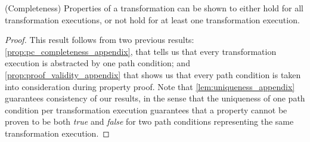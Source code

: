 \begin{pf}

\end{pf}


\begin{proposition}{(Completeness) Properties of a transformation can be shown to either hold for all transformation executions, or not hold for at least one transformation execution.}
\label{prop:proof_completeness_appendix}
\end{proposition}
\begin{proof}
This result follows from two previous results: \cref{prop:pc_completeness_appendix}, that tells us that every transformation execution is abstracted by one path condition; and \cref{prop:proof_validity_appendix} that shows us that every path condition is taken into consideration during property proof. Note that \cref{lem:uniqueness_appendix} guarantees consistency of our results, in the sense that the uniqueness of one path condition per transformation execution guarantees that a property cannot be proven to be both \emph{true} and \emph{false} for two path conditions representing the same transformation execution.
\end{proof}

\clearpage
